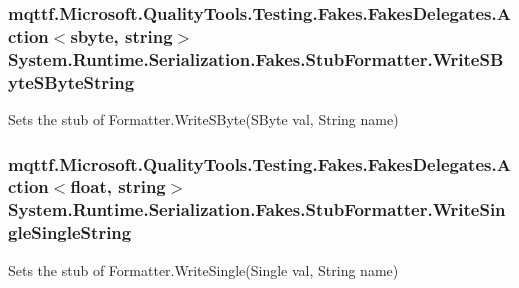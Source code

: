 \hypertarget{class_system_1_1_runtime_1_1_serialization_1_1_fakes_1_1_stub_formatter_a693a0bf6617046797c3d3fdc535ae2b5}{
\subsubsection[{Write\-S\-Byte\-S\-Byte\-String}]{\setlength{\rightskip}{0pt plus 5cm}mqttf.\-Microsoft.\-Quality\-Tools.\-Testing.\-Fakes.\-Fakes\-Delegates.\-Action$<$sbyte, string$>$ System.\-Runtime.\-Serialization.\-Fakes.\-Stub\-Formatter.\-Write\-S\-Byte\-S\-Byte\-String}}\label{class_system_1_1_runtime_1_1_serialization_1_1_fakes_1_1_stub_formatter_a693a0bf6617046797c3d3fdc535ae2b5}


Sets the stub of Formatter.\-Write\-S\-Byte(\-S\-Byte val, String name)

\hypertarget{class_system_1_1_runtime_1_1_serialization_1_1_fakes_1_1_stub_formatter_a56a9d0cf5b556045b0fe2fd165aadeae}{
\subsubsection[{Write\-Single\-Single\-String}]{\setlength{\rightskip}{0pt plus 5cm}mqttf.\-Microsoft.\-Quality\-Tools.\-Testing.\-Fakes.\-Fakes\-Delegates.\-Action$<$float, string$>$ System.\-Runtime.\-Serialization.\-Fakes.\-Stub\-Formatter.\-Write\-Single\-Single\-String}}\label{class_system_1_1_runtime_1_1_serialization_1_1_fakes_1_1_stub_formatter_a56a9d0cf5b556045b0fe2fd165aadeae}


Sets the stub of Formatter.\-Write\-Single(\-Single val, String name)

